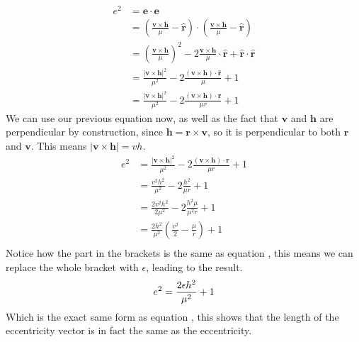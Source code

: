 \begin{align}
e^2 &= \mathbf{e} \cdot \mathbf{e} \nonumber \\
&= \left( \frac{\mathbf{v} \times \mathbf{h}}{\mu} - \hat{\mathbf{r}} \right) \cdot \left( \frac{\mathbf{v} \times \mathbf{h}}{\mu} - \hat{\mathbf{r}} \right) \nonumber \\
&= \left( \frac{\mathbf{v} \times \mathbf{h}}{\mu} \right)^2 - 2 \frac{\mathbf{v} \times \mathbf{h}}{\mu} \cdot \hat{\mathbf{r}} + \hat{\mathbf{r}} \cdot \hat{\mathbf{r}} \nonumber \\
&= \frac{|\mathbf{v} \times \mathbf{h}|^2}{\mu^2} - 2 \frac{(\mathbf{v} \times \mathbf{h})\cdot \hat{\mathbf{r}}}{\mu} + 1 \nonumber \\
&= \frac{|\mathbf{v} \times \mathbf{h}|^2}{\mu^2} - 2 \frac{(\mathbf{v} \times \mathbf{h})\cdot \mathbf{r}}{\mu r} + 1
\end{align}
We can use our previous equation  now,
as well as the fact that $\mathbf{v}$ and $\mathbf{h}$ are perpendicular
by construction, since $\mathbf{h}=\mathbf{r}\times\mathbf{v}$, so it is
perpendicular to both $\mathbf{r}$ and $\mathbf{v}$. This means 
$|\mathbf{v} \times \mathbf{h}|=vh$.
\begin{align}
e^2 &= \frac{|\mathbf{v} \times \mathbf{h}|^2}{\mu^2} - 2 \frac{(\mathbf{v} \times \mathbf{h})\cdot \mathbf{r}}{\mu r} + 1 \nonumber \\
&= \frac{v^2h^2}{\mu^2} - 2 \frac{h^2}{\mu r} + 1 \nonumber \\
&= \frac{2v^2h^2}{2\mu^2} - 2 \frac{h^2\mu}{\mu^2 r} + 1 \nonumber \\
&= \frac{2h^2}{\mu^2}\left(\frac{v^2}{2} - \frac{\mu}{r}\right) + 1 \nonumber \\
\end{align}
Notice how the part in the brackets is the same as equation ,
this means we can replace the whole bracket with $\epsilon$, leading to the result.
\begin{equation*}
e^2= \frac{2\epsilon h^2}{\mu^2} + 1 \nonumber \\
\end{equation*}
Which is the exact same form as equation ,
this shows that the length of the eccentricity vector is in fact
the same as the eccentricity.